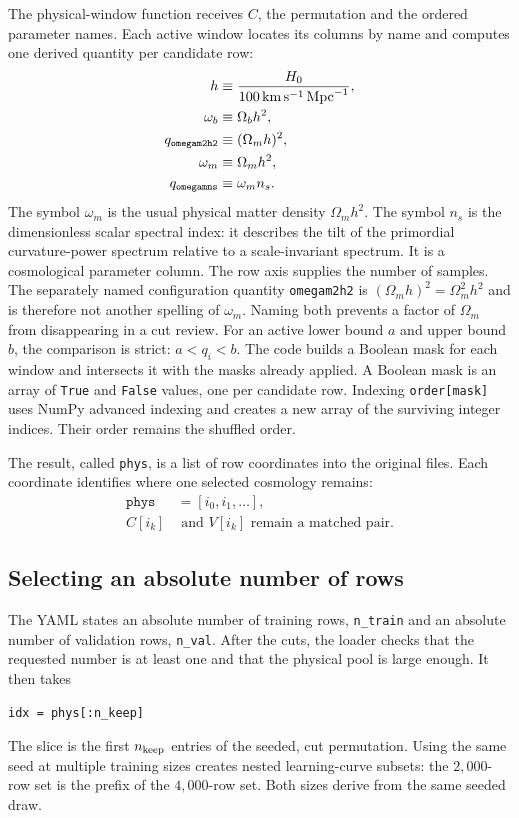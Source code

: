 \documentclass[10pt,aps,prd,twocolumn,nofootinbib]{revtex4-2}
\newcommand{\code}[1]{\texttt{#1}}
\begin{document}
The physical-window function receives $C$, the permutation and the ordered
parameter names.  Each active window locates its columns by name and computes
one derived quantity per candidate row:
\begin{align}
  h &\equiv
  \frac{H_0}{100\,{\rm km}\,{\rm s}^{-1}\,{\rm Mpc}^{-1}},\\
  \omega_b &\equiv \Omega_b h^2,\\
  q_{\tt omegam2h2} &\equiv (\Omega_m h)^2,\\
  \omega_m &\equiv \Omega_m h^2,\\
  q_{\tt omegamns} &\equiv \omega_m n_s.
\end{align}
The symbol $\omega_m$ is the usual physical matter density $\Omega_m h^2$.
The symbol $n_s$ is the dimensionless scalar spectral index: it describes the
tilt of the primordial curvature-power spectrum relative to a scale-invariant
spectrum.  It is a cosmological parameter column.  The row axis supplies the
number of samples.
The separately named configuration quantity \code{omegam2h2} is
$(\Omega_m h)^2=\Omega_m^2h^2$ and is therefore not another spelling of
$\omega_m$.  Naming both prevents a factor of $\Omega_m$ from disappearing in
a cut review.
For an active lower bound $a$ and upper bound $b$, the comparison is strict:
$a<q_i<b$.  The code builds a Boolean mask for each window and intersects it
with the masks already applied.  A Boolean mask is an array of \code{True}
and \code{False} values, one per candidate row.  Indexing
\code{order[mask]} uses NumPy advanced indexing and creates a new array of
the surviving integer indices.  Their order remains the shuffled order.

The result, called \code{phys}, is a list of row coordinates into the original
files.  Each coordinate identifies where one selected cosmology remains:
\begin{equation*}
\begin{aligned}
  \code{phys} &= [i_0,i_1,\ldots],\\
  C[i_k]&\text{ and }V[i_k]\text{ remain a matched pair.}
\end{aligned}
\end{equation*}

\subsection{Selecting an absolute number of rows}

The YAML states an absolute number of training rows, \code{n\_train} and an
absolute number of validation rows, \code{n\_val}.  After the cuts, the
loader checks that the requested number is at least one and that the physical
pool is large enough.  It then takes
\begin{verbatim}
idx = phys[:n_keep]
\end{verbatim}
The slice is the first $n_{\rm keep}$ entries of the seeded, cut permutation.
Using the same seed at multiple training sizes creates nested learning-curve
subsets: the $2{,}000$-row set is the prefix of the $4{,}000$-row set.  Both
sizes derive from the same seeded draw.
\end{document}
